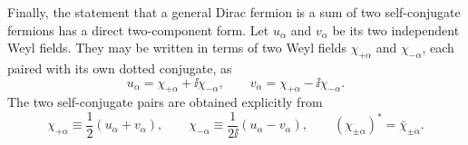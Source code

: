 Finally, the statement that a general Dirac fermion is a sum of two
self-conjugate fermions has a direct two-component form.  Let
\(u_\alpha\) and \(v_\alpha\) be its two independent Weyl fields.  They may
be written in terms of two Weyl fields \(\chi_{+\alpha}\) and
\(\chi_{-\alpha}\), each paired with its own dotted conjugate, as
\begin{equation}
  u_\alpha=\chi_{+\alpha}+\ii\chi_{-\alpha},
  \qquad
  v_\alpha=\chi_{+\alpha}-\ii\chi_{-\alpha}.
  \tag{26.A.22}\label{eq:26.A.22}
\end{equation}
The two self-conjugate pairs are obtained explicitly from
\begin{equation}
  \chi_{+\alpha}\equiv\frac12(u_\alpha+v_\alpha),
  \qquad
  \chi_{-\alpha}\equiv\frac1{2\ii}(u_\alpha-v_\alpha),
  \qquad
  (\chi_{\pm\alpha})^*=\bar\chi_{\pm\dot\alpha}.
  \tag{26.A.23}\label{eq:26.A.23}
\end{equation}
